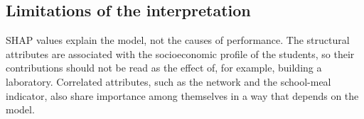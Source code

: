 \subsection{Limitations of the interpretation}
\label{sec:interp-limitations}

SHAP values explain the model, not the causes of performance. The structural attributes are
associated with the socioeconomic profile of the students, so their contributions should not be
read as the effect of, for example, building a laboratory. Correlated attributes, such as the
network and the school-meal indicator, also share importance among themselves in a way that
depends on the model.